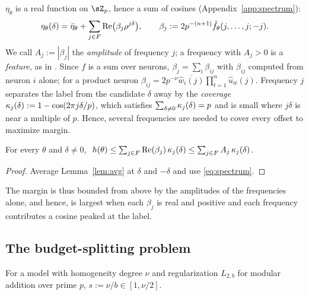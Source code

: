 
$\eta_\theta$ is a real function on $\sZ_p$, hence a sum of cosines (Appendix~\ref{app:spectrum}):
\begin{equation}
  \eta_\theta(\delta)=\bar\eta_\theta+\sum_{j\in F}\mathrm{Re}\big(\beta_j\rho^{j\delta}\big),\qquad\beta_j:=2p^{-(n+1)}\hat f_\theta(j,\dots,j;-j).
  \label{eq:spectrum}
\end{equation}
We call $A_j:=|\beta_j|$ the \emph{amplitude} of frequency $j$; a frequency with $A_j>0$ is a \emph{feature}, as in \citet{nanda2023progress,morwani2024feature}. Since $f$ is a sum over neurons, $\beta_j=\sum_i\beta_{ij}$ with $\beta_{ij}$ computed from neuron $i$ alone; for a product neuron $\beta_{ij}=2p^{-\nu}\overline{\hat w_i(j)}\prod_{t=1}^{n}\hat u_{it}(j)$. Frequency $j$ separates the label from the candidate $\delta$ away by the \emph{coverage} $\kappa_{j}(\delta):=1-\cos(2\pi j\delta/p)$, which satisfies $\sum_{\delta\neq0}\kappa_{j}(\delta)=p$ and is small where $j\delta$ is near a multiple of $p$. Hence, several frequencies are needed to cover every offset to maximize margin.

\begin{lemma}[]\label{lem:phase}
For every $\theta$ and $\delta\neq0$, $\ h(\theta)\le\sum_{j\in\Fp}\mathrm{Re}(\beta_j)\,\cov{j}{\delta}\le\sum_{j\in\Fp}A_j\,\cov{j}{\delta}$.
\end{lemma}
\begin{proof}
Average Lemma~\ref{lem:avg} at $\delta$ and $-\delta$ and use \eqref{eq:spectrum}.
\end{proof}


The margin is thus bounded from above by the amplitudes of the frequencies alone, and hence, is largest when each $\beta_j$ is real and positive and each frequency contributes a cosine peaked at the label.

\subsection{The budget-splitting problem}\label{sec:programme}

For a model with homogeneity degree $\nu$ and regularization $L_{2, b}$ for modular addition over prime $p$, $s:=\nu/b\in[1,\nu/2]$. 

